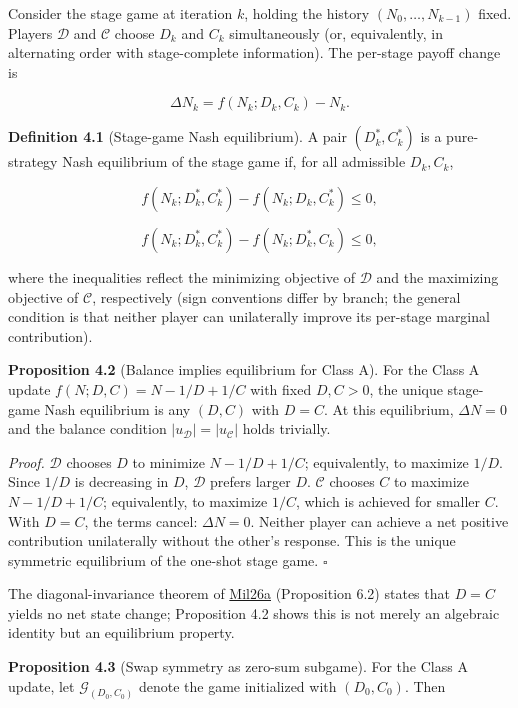 \documentclass[
  11pt,
  letterpaper,
]{article}
\begin{document}
Consider the stage game at iteration \(k\), holding the history
\((N_0, \ldots, N_{k-1})\) fixed. Players \(\mathcal{D}\) and
\(\mathcal{C}\) choose \(D_k\) and \(C_k\) simultaneously (or,
equivalently, in alternating order with stage-complete information). The
per-stage payoff change is

\[\Delta N_k = f(N_k; D_k, C_k) - N_k.\]

\textbf{Definition 4.1} (Stage-game Nash equilibrium). A pair
\((D_k^*, C_k^*)\) is a pure-strategy Nash equilibrium of the stage game
if, for all admissible \(D_k, C_k\),

\[f(N_k; D_k^*, C_k^*) - f(N_k; D_k, C_k^*) \leq 0,\]

\[f(N_k; D_k^*, C_k^*) - f(N_k; D_k^*, C_k) \leq 0,\]

where the inequalities reflect the minimizing objective of
\(\mathcal{D}\) and the maximizing objective of \(\mathcal{C}\),
respectively (sign conventions differ by branch; the general condition
is that neither player can unilaterally improve its per-stage marginal
contribution).

\textbf{Proposition 4.2} (Balance implies equilibrium for Class A). For
the Class A update \(f(N; D, C) = N - 1/D + 1/C\) with fixed
\(D, C > 0\), the unique stage-game Nash equilibrium is any \((D, C)\)
with \(D = C\). At this equilibrium, \(\Delta N = 0\) and the balance
condition \(|u_{\mathcal{D}}| = |u_{\mathcal{C}}|\) holds trivially.

\emph{Proof.} \(\mathcal{D}\) chooses \(D\) to minimize
\(N - 1/D + 1/C\); equivalently, to maximize \(1/D\). Since \(1/D\) is
decreasing in \(D\), \(\mathcal{D}\) prefers larger \(D\).
\(\mathcal{C}\) chooses \(C\) to maximize \(N - 1/D + 1/C\);
equivalently, to maximize \(1/C\), which is achieved for smaller \(C\).
With \(D = C\), the terms cancel: \(\Delta N = 0\). Neither player can
achieve a net positive contribution unilaterally without the other's
response. This is the unique symmetric equilibrium of the one-shot stage
game. \(\square\)

The diagonal-invariance theorem of
\href{https://github.com/baardev/truevalue/blob/main/docnav/Research/papers/1_recursive-tholonic-five-constants/1_recursive-tholonic-five-constants.pdf}{Mil26a}
(Proposition 6.2) states that \(D = C\) yields no net state change;
Proposition 4.2 shows this is not merely an algebraic identity but an
equilibrium property.

\textbf{Proposition 4.3} (Swap symmetry as zero-sum subgame). For the
Class A update, let \(\mathcal{G}_{(D_0, C_0)}\) denote the game
initialized with \((D_0, C_0)\). Then
\end{document}
